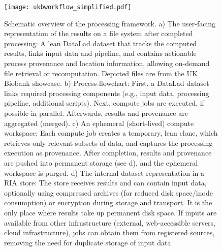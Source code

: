 \begin{figure}
	\centering
	\texttt{[image: ukbworkflow\_simplified.pdf]}
	\caption[Schematic overview of the processing framework]{Schematic overview of the processing framework. a) The user-facing representation of the results on a file system after completed processing: A lean DataLad dataset that tracks the computed results, links input data and pipeline, and contains actionable process provenance and location information, allowing on-demand file retrieval or recomputation. Depicted files are from the UK Biobank showcase. b) Process-flowchart: First, a DataLad dataset links required processing components (e.g., input data, processing pipeline, additional scripts). Next, compute jobs are executed, if possible in parallel. Afterwards, results and provenance are aggregated (merged). c) An ephemeral (short-lived) compute workspace: Each compute job creates a temporary, lean clone, which retrieves only relevant subsets of data, and captures the processing execution as provenance. After completion, results and provenance are pushed into permanent storage (see d), and the ephemeral workspace is purged. d) The internal dataset representation in a RIA store: The store receives results and can contain input data, optionally using compressed archives (for reduced disk space/inode consumption) or encryption during storage and transport. It is the only place where results take up permanent disk space. If inputs are available from other infrastructure (external, web-accessible servers, cloud infrastructure), jobs can obtain them from registered sources, removing the need for duplicate storage of input data.}
	\label{fig:fairly_workflow}
\end{figure}


